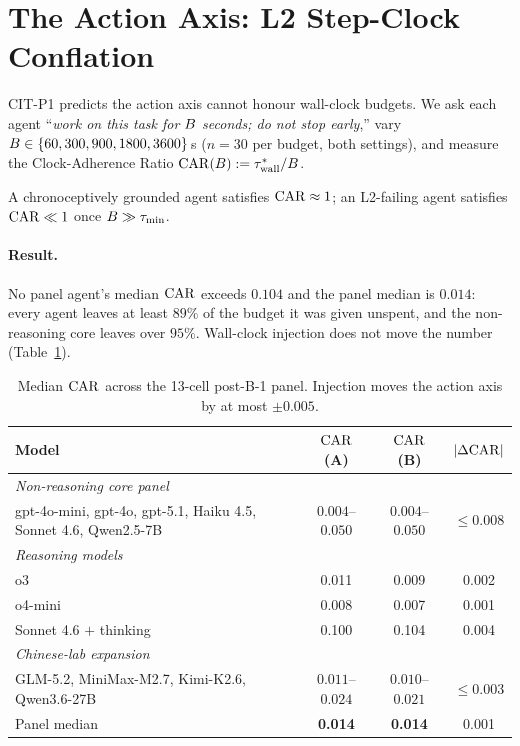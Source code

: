 
\section{The Action Axis: L2 Step-Clock Conflation}
\label{sec:l2}

CIT-P1 predicts the action axis cannot honour wall-clock budgets. We ask each agent ``\textit{work on this task for $B$ seconds; do not stop early},'' vary $B \in \{60, 300, 900, 1800, 3600\}$\,s ($n=30$ per budget, both settings), and measure the Clock-Adherence Ratio $\mathrm{CAR}(B) := \tau_{\mathrm{wall}}^{*}/B$.

\begin{definition}
A chronoceptively grounded agent satisfies $\mathrm{CAR} \approx 1$; an L2-failing agent satisfies $\mathrm{CAR} \ll 1$ once $B \gg \tau_{\min}$.
\end{definition}

\paragraph{Result.} No panel agent's median $\mathrm{CAR}$ exceeds $0.104$ and the panel median is $0.014$: every agent leaves at least $89\%$ of the budget it was given unspent, and the non-reasoning core leaves over $95\%$. Wall-clock injection does not move the number (Table~\ref{tab:l2-car}).

\begin{table}[h]
\centering
\small
\caption{Median $\mathrm{CAR}$ across the 13-cell post-B-1 panel. Injection moves the action axis by at most $\pm 0.005$.}
\label{tab:l2-car}
\begin{tabular}{lccc}
\toprule
Model & $\mathrm{CAR}$ (A) & $\mathrm{CAR}$ (B) & $|\Delta \mathrm{CAR}|$ \\
\midrule
\multicolumn{4}{l}{\textit{Non-reasoning core panel}} \\
gpt-4o-mini, gpt-4o, gpt-5.1, Haiku 4.5, Sonnet 4.6, Qwen2.5-7B & $0.004$--$0.050$ & $0.004$--$0.050$ & $\leq 0.008$ \\
\midrule
\multicolumn{4}{l}{\textit{Reasoning models}} \\
o3 & 0.011 & 0.009 & 0.002 \\
o4-mini & 0.008 & 0.007 & 0.001 \\
Sonnet 4.6 $+$ thinking & 0.100 & 0.104 & 0.004 \\
\midrule
\multicolumn{4}{l}{\textit{Chinese-lab expansion}} \\
GLM-5.2, MiniMax-M2.7, Kimi-K2.6, Qwen3.6-27B & $0.011$--$0.024$ & $0.010$--$0.021$ & $\leq 0.003$ \\
\midrule
Panel median & \textbf{0.014} & \textbf{0.014} & 0.001 \\
\bottomrule
\end{tabular}
\end{table}

